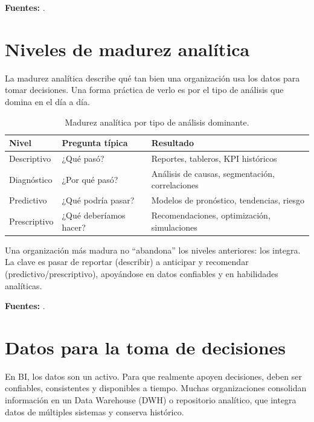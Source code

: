 \documentclass[12pt]{article}
\begin{document}
\noindent\textbf{Fuentes:} \cite{ontotext_dikw, matillion_structured}.

\section{Niveles de madurez analítica}
La madurez analítica describe qué tan bien una organización usa los datos para tomar decisiones. Una forma práctica de verlo es por el tipo de análisis que domina en el día a día.

\begin{table}[h!]
\centering
\begin{tabular}{@{}p{3cm}p{4cm}p{6cm}@{}}
\toprule
\textbf{Nivel} & \textbf{Pregunta típica} & \textbf{Resultado} \\
\midrule
Descriptivo & ¿Qué pasó? & Reportes, tableros, KPI históricos \\
Diagnóstico & ¿Por qué pasó? & Análisis de causas, segmentación, correlaciones \\
Predictivo & ¿Qué podría pasar? & Modelos de pronóstico, tendencias, riesgo \\
Prescriptivo & ¿Qué deberíamos hacer? & Recomendaciones, optimización, simulaciones \\
\bottomrule
\end{tabular}
\caption{Madurez analítica por tipo de análisis dominante.}
\end{table}

Una organización más madura no ``abandona'' los niveles anteriores: los integra. La clave es pasar de reportar (describir) a anticipar y recomendar (predictivo/prescriptivo), apoyándose en datos confiables y en habilidades analíticas.

\noindent\textbf{Fuentes:} \cite{gartner_data_analytics, davenport_competing}.

\section{Datos para la toma de decisiones}
En BI, los datos son un activo. Para que realmente apoyen decisiones, deben ser confiables, consistentes y disponibles a tiempo. Muchas organizaciones consolidan información en un Data Warehouse (DWH) o repositorio analítico, que integra datos de múltiples sistemas y conserva histórico.
\end{document}
